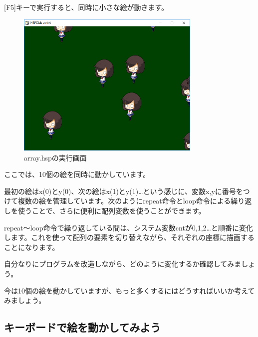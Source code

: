 [F5]キーで実行すると、同時に小さな絵が動きます。

\begin{figure}[H]
    \begin{center}
      \includegraphics[keepaspectratio,width=8.811cm,height=6.946cm]{text04-img/s_array.png}
      \caption{array.hspの実行画面}
    \end{center}
    \label{fig:prog_menu}
\end{figure}

ここでは、10個の絵を同時に動かしています。

最初の絵はx(0)とy(0)、次の絵はx(1)とy(1)…という感じに、変数x,yに番号をつけて複数の絵を管理しています。次のようにrepeat命令とloop命令による繰り返しを使うことで、さらに便利に配列変数を使うことができます。


\begin{description}
    \item {}
    \item {}
    \item {}
    \item {}
\end{description}

repeat〜loop命令で繰り返している間は、システム変数cntが0,1,2…と順番に変化します。これを使って配列の要素を切り替えながら、それぞれの座標に描画することになります。

自分なりにプログラムを改造しながら、どのように変化するか確認してみましょう。

今は10個の絵を動かしていますが、もっと多くするにはどうすればいいか考えてみましょう。


\newpage
\subsection{キーボードで絵を動かしてみよう}

